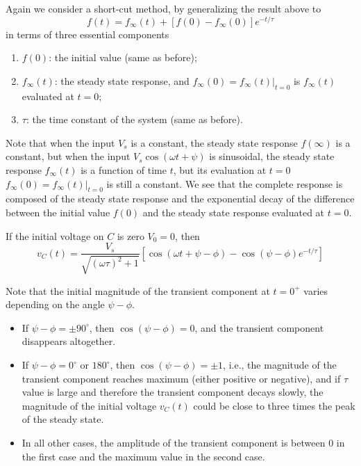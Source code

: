 \documentclass{article}
\begin{document}
Again we consider a short-cut method, by generalizing the result above to 
\begin{equation}
  f(t)=f_{\infty}(t)+[f(0)-f_{\infty}(0)]e^{-t/\tau} 
\end{equation}
in terms of three essential components
\begin{enumerate}
\item $f(0)$: the initial value (same as before);
\item $f_{\infty}(t)$: the steady state response, and
  $f_{\infty}(0)=f_{\infty}(t)\big|_{t=0}$ is $f_{\infty}(t)$ evaluated 
  at $t=0$;
\item $\tau$: the time constant of the system (same as before).
\end{enumerate}
Note that when the input $V_s$ is a constant, the steady state response
$f(\infty)$ is a constant, but when the input $V_s\cos(\omega t+\psi)$
is sinusoidal, the steady state response $f_{\infty}(t)$ is a function of 
time $t$, but its evaluation at $t=0$ $f_{\infty}(0)=f_{\infty}(t)\big|_{t=0}$ 
is still a constant. We see that the complete response is composed of 
the steady state response and the exponential decay of the difference 
between the initial value $f(0)$ and the steady state response evaluated
at $t=0$.

If the initial voltage on $C$ is zero $V_0=0$, then
\begin{equation}
  v_C(t)=\frac{V_s}{\sqrt{(\omega \tau)^2+1}}[\cos(\omega t+\psi-\phi) 
    -\cos(\psi-\phi) e^{-t/\tau}]	
\end{equation}

Note that the initial magnitude of the transient component at $t=0^+$
varies depending on the angle $\psi-\phi$. 
\begin{itemize}
\item If $\psi-\phi=\pm 90^\circ$, then $\cos(\psi-\phi)=0$, and the 
  transient component disappears altogether.
\item If $\psi-\phi=0^\circ$ or $180^\circ$, then $\cos(\psi-\phi)=\pm 1$,
  i.e., the magnitude of the transient component reaches maximum (either 
  positive or negative), and if $\tau$ value is large and therefore the 
  transient component decays slowly, the magnitude of the initial voltage
  $v_C(t)$ could be close to three times the peak of the steady state. 
\item In all other cases, the amplitude of the transient component is
  between 0 in the first case and the maximum value in the second case.
\end{itemize}
\end{document}
